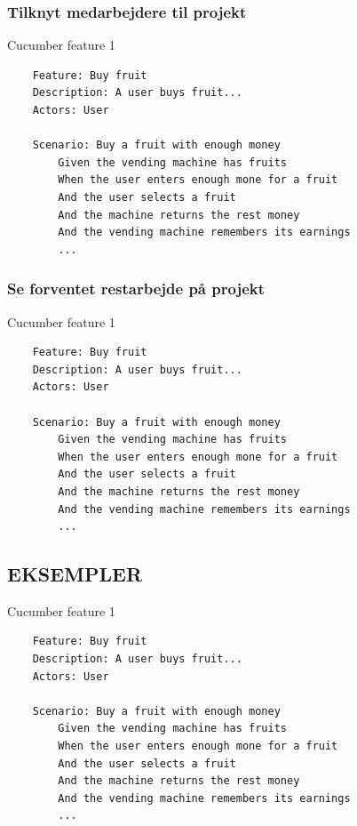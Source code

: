 \subsubsection{Tilknyt medarbejdere til projekt}
\begin{listing}[H]
    \centering
    \caption{Cucumber feature 1}\label{lst:feature1}
    \begin{verbatim}
    Feature: Buy fruit
    Description: A user buys fruit...
    Actors: User
        
    Scenario: Buy a fruit with enough money
        Given the vending machine has fruits
        When the user enters enough mone for a fruit
        And the user selects a fruit
        And the machine returns the rest money
        And the vending machine remembers its earnings
        ...
    \end{verbatim}
\end{listing}
\FloatBarrier
\subsubsection{Se forventet restarbejde på projekt}
\FloatBarrier
\begin{listing}[H]
    \centering
    \caption{Cucumber feature 1}\label{lst:feature1}
    \begin{verbatim}
    Feature: Buy fruit
    Description: A user buys fruit...
    Actors: User
        
    Scenario: Buy a fruit with enough money
        Given the vending machine has fruits
        When the user enters enough mone for a fruit
        And the user selects a fruit
        And the machine returns the rest money
        And the vending machine remembers its earnings
        ...
    \end{verbatim}
\end{listing}
\FloatBarrier
\subsection{EKSEMPLER}

\begin{listing}[H]
    \centering
    \caption{Cucumber feature 1}\label{lst:feature1}
    \begin{verbatim}
    Feature: Buy fruit
    Description: A user buys fruit...
    Actors: User
        
    Scenario: Buy a fruit with enough money
        Given the vending machine has fruits
        When the user enters enough mone for a fruit
        And the user selects a fruit
        And the machine returns the rest money
        And the vending machine remembers its earnings
        ...
    \end{verbatim}
\end{listing}

